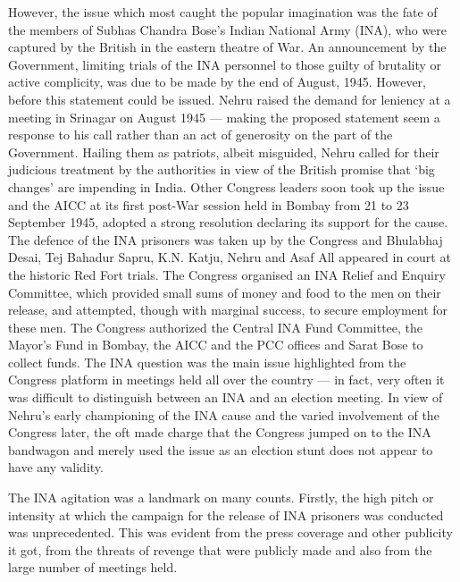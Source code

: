 However, the issue which most caught the popular imagination was the fate of the members of Subhas Chandra Bose’s Indian National Army (INA), who were captured by the British in the eastern theatre of War. An announcement by the Government, limiting trials of the INA personnel to those guilty of brutality or active complicity, was due to be made by the end of August, 1945. However, before this statement could be issued. Nehru raised the demand for leniency at a meeting in Srinagar on August 1945 — making the proposed statement seem a response to his call rather than an act of generosity on the part of the Government. Hailing them as patriots, albeit misguided, Nehru called for their judicious treatment by the authorities in view of the British promise that ‘big changes’ are impending in India. Other Congress leaders soon took up the issue and the AICC at its first post-War session held in Bombay from 21 to 23 September 1945, adopted a strong resolution declaring its support for the cause. The defence of the INA prisoners was taken up by the Congress and Bhulabhaj Desai, Tej Bahadur Sapru, K.N. Katju, Nehru and Asaf All appeared in court at the historic Red Fort trials. The Congress organised an INA Relief and Enquiry Committee, which provided small sums of money and food to the men on their release, and attempted, though with marginal success, to secure employment for these men. The Congress authorized the Central INA Fund Committee, the Mayor’s Fund in Bombay, the AICC and the PCC offices and Sarat Bose to collect funds. The INA question was the main issue highlighted from the Congress platform in meetings held all over the country — in fact, very often it was difficult to distinguish between an INA and an election meeting. In view of Nehru’s early championing of the INA cause and the varied involvement of the Congress later, the oft made charge that the Congress jumped on to the INA bandwagon and merely used the issue as an election stunt does not appear to have any validity. 

The INA agitation was a landmark on many counts. Firstly, the high pitch or intensity at which the campaign for the release of INA prisoners was conducted was unprecedented. This was evident from the press coverage and other publicity it got, from the threats of revenge that were publicly made and also from the large number of meetings held. 


